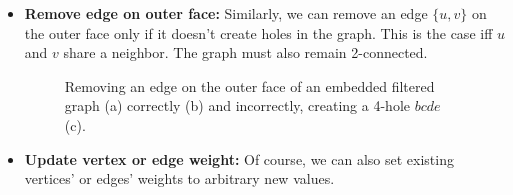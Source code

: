 \begin{itemize}
	\item \textbf{Remove edge on outer face:} Similarly, we can remove an edge $\{u, v\}$ on the outer face only if it doesn't create holes in the graph. This is the case iff $u$ and $v$ share a neighbor. The graph must also remain 2-connected.
\begin{figure}[H]
	\centering
	\quad
	\quad
	\caption{Removing an edge on the outer face of an embedded filtered graph (a) correctly (b) and incorrectly, creating a 4-hole $bcde$ (c).}
	\label{fig:transformation}
\end{figure}

	\item \textbf{Update vertex or edge weight:} Of course, we can also set existing vertices' or edges' weights to arbitrary new values.
\end{itemize}
